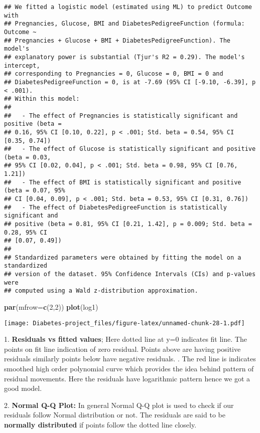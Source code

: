 \documentclass[
]{article}
\newenvironment{Shaded}{\begin{snugshade}}{\end{snugshade}}
\newcommand{\AttributeTok}[1]{\textcolor[rgb]{0.13,0.29,0.53}{#1}}
\newcommand{\DecValTok}[1]{\textcolor[rgb]{0.00,0.00,0.81}{#1}}
\newcommand{\FunctionTok}[1]{\textcolor[rgb]{0.13,0.29,0.53}{\textbf{#1}}}
\newcommand{\NormalTok}[1]{#1}
\begin{document}
\begin{verbatim}
## We fitted a logistic model (estimated using ML) to predict Outcome with
## Pregnancies, Glucose, BMI and DiabetesPedigreeFunction (formula: Outcome ~
## Pregnancies + Glucose + BMI + DiabetesPedigreeFunction). The model's
## explanatory power is substantial (Tjur's R2 = 0.29). The model's intercept,
## corresponding to Pregnancies = 0, Glucose = 0, BMI = 0 and
## DiabetesPedigreeFunction = 0, is at -7.69 (95% CI [-9.10, -6.39], p < .001).
## Within this model:
## 
##   - The effect of Pregnancies is statistically significant and positive (beta =
## 0.16, 95% CI [0.10, 0.22], p < .001; Std. beta = 0.54, 95% CI [0.35, 0.74])
##   - The effect of Glucose is statistically significant and positive (beta = 0.03,
## 95% CI [0.02, 0.04], p < .001; Std. beta = 0.98, 95% CI [0.76, 1.21])
##   - The effect of BMI is statistically significant and positive (beta = 0.07, 95%
## CI [0.04, 0.09], p < .001; Std. beta = 0.53, 95% CI [0.31, 0.76])
##   - The effect of DiabetesPedigreeFunction is statistically significant and
## positive (beta = 0.81, 95% CI [0.21, 1.42], p = 0.009; Std. beta = 0.28, 95% CI
## [0.07, 0.49])
## 
## Standardized parameters were obtained by fitting the model on a standardized
## version of the dataset. 95% Confidence Intervals (CIs) and p-values were
## computed using a Wald z-distribution approximation.
\end{verbatim}

\begin{Shaded}
\begin{Highlighting}[]
\FunctionTok{par}\NormalTok{(}\AttributeTok{mfrow=}\FunctionTok{c}\NormalTok{(}\DecValTok{2}\NormalTok{,}\DecValTok{2}\NormalTok{))}
\FunctionTok{plot}\NormalTok{(log1)}
\end{Highlighting}
\end{Shaded}

\texttt{[image: Diabetes-project\_files/figure-latex/unnamed-chunk-28-1.pdf]}

1. \textbf{Residuals vs fitted values}; Here dotted line at y=0
indicates fit line. The points on fit line indication of zero residual.
Points above are having positive residuals similarly points below have
negative residuals. . The red line is indicates smoothed high order
polynomial curve which provides the idea behind pattern of residual
movements. Here the residuals have logarithmic pattern hence we got a
good model.

2. \textbf{Normal Q-Q Plot:} In general Normal Q-Q plot is used to check
if our residuals follow Normal distribution or not. The residuals are
said to be \textbf{normally distributed} if points follow the dotted
line closely.
\end{document}
